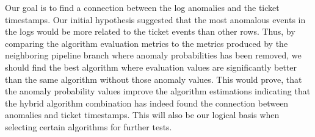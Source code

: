 Our goal is to find a connection
between the log anomalies and the ticket timestamps.
Our initial hypothesis suggested
that the most anomalous events in the logs
would be more related to the ticket events than other rows.
Thus,
by comparing the algorithm evaluation metrics
to the metrics produced by the neighboring pipeline branch
where anomaly probabilities has been removed,
we should find the best algorithm where evaluation values
are significantly better than the same algorithm without those anomaly values.
This would prove,
that the anomaly probability values improve the algorithm estimations
indicating that the hybrid algorithm combination has indeed found the connection
between anomalies and ticket timestamps.
This will also be our logical basis when selecting certain algorithms for further tests.




\clearpage